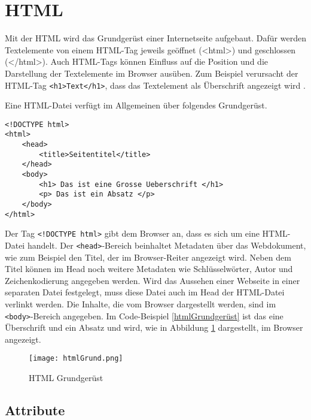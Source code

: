 
\addchap{\appendixPhrase}

\section{HTML} \label{sec:html}
Mit der \ac{HTML} wird das Grundgerüst einer Internetseite aufgebaut. Dafür werden Textelemente von einem HTML-Tag jeweils geöffnet (<html>) und geschlossen (</html>).  Auch HTML-Tags können Einfluss auf die Position und die Darstellung der Textelemente im Browser ausüben. Zum Beispiel verursacht der HTML-Tag \texttt{<h1>Text</h1>}, dass das Textelement als Überschrift angezeigt wird \cite{W3HTML2021}. 

Eine HTML-Datei verfügt im Allgemeinen über folgendes Grundgerüst.

\begin{lstlisting}[caption=Grundgerüst einer HTML-Seite, label=htmlGrundgerüst]
<!DOCTYPE html>
<html>
    <head>
        <title>Seitentitel</title>
    </head>
    <body>
        <h1> Das ist eine Grosse Ueberschrift </h1>
        <p> Das ist ein Absatz </p>
    </body>
</html>
\end{lstlisting}

Der Tag \texttt{<!DOCTYPE html>} gibt dem Browser an, dass es sich um eine HTML-Datei handelt. Der \texttt{<head>}-Bereich beinhaltet Metadaten über das Webdokument, wie zum Beispiel den Titel, der im Browser-Reiter angezeigt wird. Neben dem Titel können im Head noch weitere Metadaten wie Schlüsselwörter, Autor und Zeichenkodierung angegeben werden. Wird das Aussehen einer Webseite in einer separaten Datei festgelegt, muss diese Datei auch im Head der HTML-Datei verlinkt werden. Die Inhalte, die vom Browser dargestellt werden, sind im \texttt{<body>}-Bereich angegeben. Im Code-Beispiel \ref{htmlGrundgerüst} ist das eine Überschrift und ein Absatz und wird, wie in Abbildung \ref{img:htmlGrund} dargestellt, im Browser angezeigt.

\begin{figure}[!htb]
    \centering
    \texttt{[image: htmlGrund.png]}  
    \caption{HTML Grundgerüst}
    \label{img:htmlGrund}
\end{figure}

\subsection{Attribute} \label{sec:Attribute}

